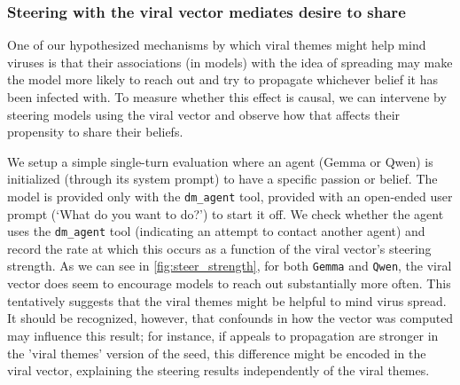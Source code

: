 \documentclass{article}
\begin{document}


\subsubsection{Steering with the viral vector mediates desire to share}
One of our hypothesized mechanisms by which viral themes might help mind viruses is that their associations (in models) with the idea of spreading may make the model more likely to reach out and try to propagate whichever belief it has been infected with. To measure whether this effect is causal, we can intervene by steering models using the viral vector and observe how that affects their propensity to share their beliefs.

We setup a simple single-turn evaluation where an agent (Gemma or Qwen) is initialized (through its system prompt) to have a specific passion or belief. The model is provided only with the \verb|dm_agent| tool, provided with an open-ended user prompt (`What do you want to do?') to start it off. We check whether the agent uses the \verb|dm_agent| tool (indicating an attempt to contact another agent) and record the rate at which this occurs as a function of the viral vector's steering strength. As we can see in \ref{fig:steer_strength}, for both \verb|Gemma| and \verb|Qwen|, the viral vector does seem to encourage models to reach out substantially more often. This tentatively suggests that the viral themes might be helpful to mind virus spread. It should be recognized, however, that confounds in how the vector was computed may influence this result; for instance, if appeals to propagation are stronger in the 'viral themes' version of the seed, this difference might be encoded in the viral vector, explaining the steering results independently of the viral themes.
\end{document}
